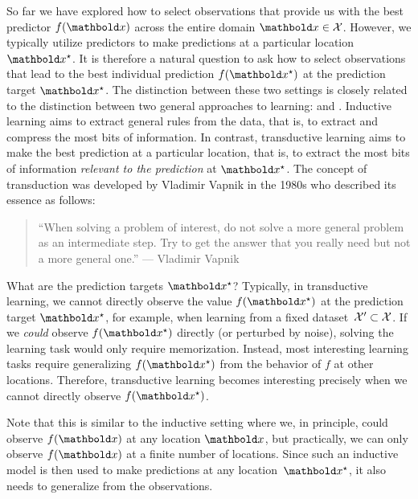 So far we have explored how to select observations that provide us with the best predictor $f(\vx)$ across the entire domain $\vx \in \spX$.
However, we typically utilize predictors to make predictions at a particular location $\vxs$.
It is therefore a natural question to ask how to select observations that lead to the best individual prediction $f(\vxs)$ at the prediction target $\vxs$.
The distinction between these two settings is closely related to the distinction between two general approaches to learning:  and .
Inductive learning aims to extract general rules from the data, that is, to extract and compress the most bits of information.
In contrast, transductive learning aims to make the best prediction at a particular location, that is, to extract the most bits of information \emph{relevant to the prediction} at $\vxs$.
The concept of transduction was developed by Vladimir Vapnik in the 1980s who described its essence as follows: \begin{quote}
  ``When solving a problem of interest, do not solve a more general problem as an intermediate step.
  Try to get the answer that you really need but not a more general one.'' --- Vladimir Vapnik
\end{quote}

\begin{rmk}{What are the prediction targets $\vxs$?}{}
  Typically, in transductive learning, we cannot directly observe the value $f(\vxs)$ at the prediction target $\vxs$, for example, when learning from a fixed dataset~$\mathcal{X}' \subset \mathcal{X}$.
  If we \emph{could} observe $f(\vxs)$ directly (or perturbed by noise), solving the learning task would only require memorization.
  Instead, most interesting learning tasks require generalizing $f(\vxs)$ from the behavior of $f$ at other locations.
  Therefore, transductive learning becomes interesting precisely when we cannot directly observe $f(\vxs)$.

  Note that this is similar to the inductive setting where we, in principle, could observe $f(\vx)$ at any location $\vx$, but practically, we can only observe $f(\vx)$ at a finite number of locations.
  Since such an inductive model is then used to make predictions at any location~$\vxs$, it also needs to generalize from the observations.
\end{rmk}

